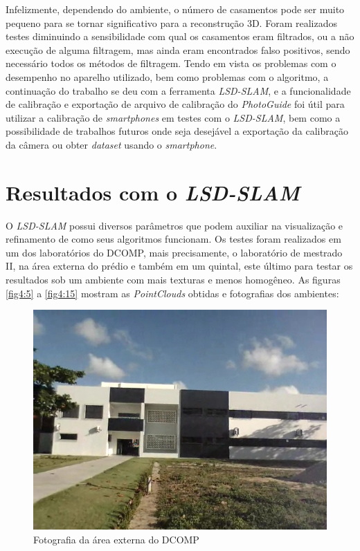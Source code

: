 Infelizmente, dependendo do ambiente, o número de casamentos pode ser muito pequeno para se tornar significativo para a reconstrução 3D. Foram realizados testes diminuindo a sensibilidade com qual os casamentos eram filtrados, ou a não execução de alguma filtragem, mas ainda eram encontrados falso positivos, sendo necessário todos os métodos de filtragem. 
	Tendo em vista os problemas com o desempenho no aparelho utilizado, bem como problemas com o algoritmo, a continuação do trabalho se deu com a ferramenta \textit{LSD-SLAM}, e a funcionalidade de calibração e exportação de arquivo de calibração do \textit{PhotoGuide} foi útil para utilizar a calibração de \textit{smartphones} em testes com o \textit{LSD-SLAM}, bem como a possibilidade de trabalhos futuros onde seja desejável a exportação da calibração da câmera ou obter \textit{dataset} usando o \textit{smartphone}.
	
\section{Resultados com o \textit{LSD-SLAM}}

O \textit{LSD-SLAM} possui diversos parâmetros que podem auxiliar na visualização e refinamento de como seus algoritmos funcionam. Os testes foram realizados em um dos laboratórios do DCOMP, mais precisamente, o laboratório de mestrado II, na área externa do prédio e também em um quintal, este último para testar os resultados sob um ambiente com mais texturas e menos homogêneo. As figuras \ref{fig4:5} a \ref{fig4:15} mostram as \textit{PointClouds} obtidas e fotografias dos ambientes:

\begin{figure}[H]
	\centering
		\includegraphics[width= \textwidth]{Imagens/figura4-7.jpg}
	\caption{Fotografia da área externa do DCOMP}
	\label{fig4:7}
\end{figure}

